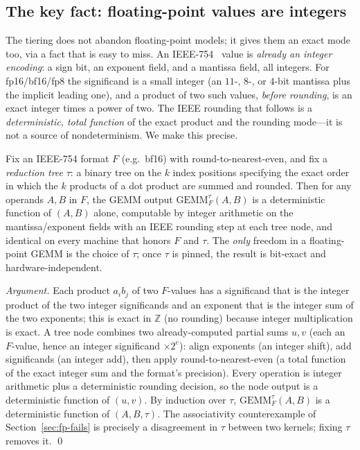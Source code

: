 \subsection{The key fact: floating-point values are integers}
\label{sec:fp-are-integers}

The tiering does not abandon floating-point models; it gives them an exact mode too,
via a fact that is easy to miss. An IEEE-754~\cite{ieee754} value is \emph{already an integer
encoding}: a sign bit, an exponent field, and a mantissa field, all integers. For
fp16/bf16/fp8 the significand is a small integer (an $11$-, $8$-, or $4$-bit mantissa
plus the implicit leading one), and a product of two such values, \emph{before
rounding}, is an exact integer times a power of two. The IEEE rounding that follows is
a \emph{deterministic, total function} of the exact product and the rounding mode---it
is not a source of nondeterminism. We make this precise.

\begin{proposition}
\label{prop:fp-integer}
Fix an IEEE-754 format $F$ (e.g.\ bf16) with round-to-nearest-even, and fix a
\emph{reduction tree} $\tau$: a binary tree on the $k$ index positions specifying the
exact order in which the $k$ products of a dot product are summed and rounded. Then for
any operands $A,B$ in $F$, the GEMM output $\mathrm{GEMM}_F^\tau(A,B)$ is a
deterministic function of $(A,B)$ alone, computable by integer arithmetic on the
mantissa/exponent fields with an IEEE rounding step at each tree node, and identical on
every machine that honors $F$ and $\tau$. The \emph{only} freedom in a floating-point
GEMM is the choice of $\tau$; once $\tau$ is pinned, the result is bit-exact and
hardware-independent.
\end{proposition}

\begin{proof}[Argument]
Each product $a_i b_j$ of two $F$-values has a significand that is the integer product
of the two integer significands and an exponent that is the integer sum of the two
exponents; this is exact in $\mathbb{Z}$ (no rounding) because integer multiplication
is exact. A tree node combines two already-computed partial sums $u,v$ (each an
$F$-value, hence an integer significand $\times 2^{e}$): align exponents (an integer
shift), add significands (an integer add), then apply round-to-nearest-even (a total
function of the exact integer sum and the format's precision). Every operation is
integer arithmetic plus a deterministic rounding decision, so the node output is a
deterministic function of $(u,v)$. By induction over $\tau$, $\mathrm{GEMM}_F^\tau(A,B)$
is a deterministic function of $(A,B,\tau)$. The associativity counterexample of
Section~\ref{sec:fp-fails} is precisely a disagreement in $\tau$ between two kernels;
fixing $\tau$ removes it. \qed
\end{proof}

